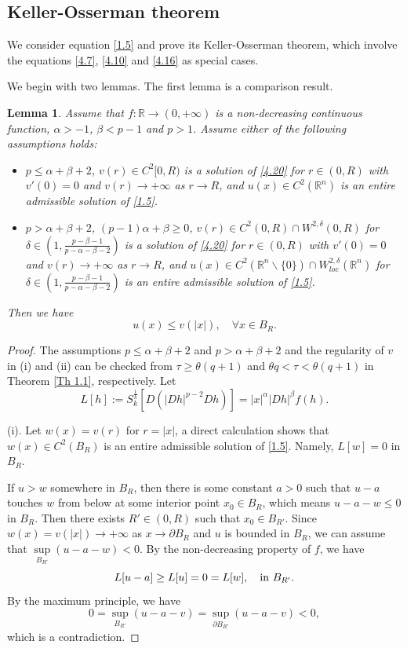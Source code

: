 \documentclass[a4paper,11pt]{amsart}
\theoremstyle{plain}
\newtheorem{Lemma}{Lemma}[section]
\theoremstyle{remark}
\numberwithin{equation}{section}
\numberwithin{figure}{section}
\numberwithin{remark}{section}
\begin{document}
\begin{sloppypar}
\subsection{Keller-Osserman theorem}\label{Section 4.3}
We consider equation \eqref{1.5} and prove its Keller-Osserman theorem, which involve the equations \eqref{4.7}, \eqref{4.10} and \eqref{4.16} as special cases.

We begin with two lemmas. The first lemma is a comparison result.

\begin{Lemma}\label{Lemma 4.1}
Assume that $f: \mathbb{R} \to (0,+\infty)$ is a non-decreasing continuous function, $\alpha>-1$, $\beta<p-1$ and $p>1$.
Assume either of the following assumptions holds:
\begin{itemize}
\item [(i).]
$p\le \alpha+\beta+2$, $v(r)\in C^2[0, R)$ is a solution of \eqref{4.20} for $r\in (0, R)$ with $v'(0)=0$ and $v(r)\to +\infty$ as $r\to R$, and $u(x)\in C^2(\mathbb{R}^n)$ is an entire admissible solution of \eqref{1.5}. 
\item [(ii).]
$p> \alpha+\beta+2$, $(p-1)\alpha+\beta \ge 0$, $v(r)\in C^2(0, R)\cap W^{2,\delta}(0, R)$ for $\delta \in (1, \frac{p-\beta-1}{p-\alpha-\beta-2})$ is a solution of \eqref{4.20} for $r\in (0, R)$ with $v'(0)=0$ and $v(r)\to +\infty$ as $r\to R$, and $u(x)\in C^2(\mathbb{R}^n\backslash \{0\})\cap  W_{loc}^{2,\delta}(\mathbb{R}^n)$ for $\delta \in (1, \frac{p-\beta-1}{p-\alpha-\beta-2})$ is an entire admissible solution of \eqref{1.5}. 
\end{itemize}
Then we have
\begin{equation}\label{4.21}
u(x)\le v(|x|), \quad \forall x\in B_R.
\end{equation}
\end{Lemma}
\begin{proof} 
The assumptions $p\le \alpha+\beta+2$ and $p> \alpha+\beta+2$ and the regularity of $v$ in (i) and (ii) can be checked from $\tau \ge \theta (q+1)$ and $\theta q < \tau < \theta (q+1)$ in Theorem \ref{Th 1.1}, respectively. 
Let 
$$
L[h]:= S_k^{\frac{1}{k}} [D(|Dh|^{p-2}Dh)] = |x|^\alpha |Dh|^\beta f(h).
$$

(i).
Let $w(x)=v(r)$ for $r=|x|$, a direct calculation shows that $w(x)\in C^2(B_R)$ is an entire admissible solution of \eqref{1.5}. Namely, $L[w]=0$ in $B_R$.

If $u>w$ somewhere in $B_R$, then there is some constant $a>0$ such that $u-a$ touches $w$ from below at some interior point $x_0\in B_R$, which means $u-a-w\le 0$ in $B_R$. Then there exists $R'\in (0, R)$ such that $x_0\in B_{R'}$. Since $w(x)=v(|x|)\to +\infty$ as $x\to \partial B_R$ and $u$ is bounded in $B_R$, we can assume that $\sup\limits_{B_{R'}}(u-a-w)<0$.
By the non-decreasing property of $f$, we have
\begin{equation}\label{4.22}
L[u-a] \ge L[u] =0 = L[w], \quad {\rm in} \ B_{R'}.
\end{equation}
By the maximum principle, we have
$$
0= \sup_{B_{R'}}(u-a-v) = \sup_{\partial B_{R'}}(u-a-v) <0,
$$
which is a contradiction.


\end{proof}
\end{sloppypar}
\end{document}
